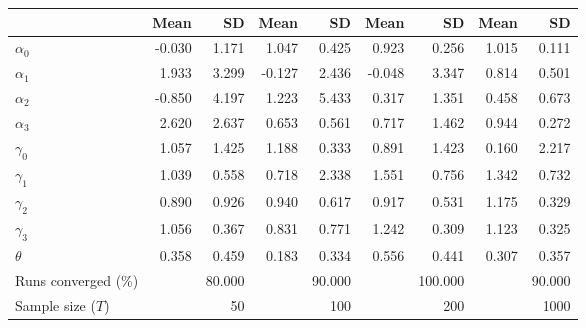 
\begin{tabular}[t]{lrrrrrrrr}
\toprule
  & Mean & SD & Mean  & SD  & Mean   & SD   & Mean    & SD   \\
\midrule
$\alpha_{0}$ & -0.030 & 1.171 & 1.047 & 0.425 & 0.923 & 0.256 & 1.015 & 0.111\\
$\alpha_{1}$ & 1.933 & 3.299 & -0.127 & 2.436 & -0.048 & 3.347 & 0.814 & 0.501\\
$\alpha_{2}$ & -0.850 & 4.197 & 1.223 & 5.433 & 0.317 & 1.351 & 0.458 & 0.673\\
$\alpha_{3}$ & 2.620 & 2.637 & 0.653 & 0.561 & 0.717 & 1.462 & 0.944 & 0.272\\
$\gamma_{0}$ & 1.057 & 1.425 & 1.188 & 0.333 & 0.891 & 1.423 & 0.160 & 2.217\\
$\gamma_{1}$ & 1.039 & 0.558 & 0.718 & 2.338 & 1.551 & 0.756 & 1.342 & 0.732\\
$\gamma_{2}$ & 0.890 & 0.926 & 0.940 & 0.617 & 0.917 & 0.531 & 1.175 & 0.329\\
$\gamma_{3}$ & 1.056 & 0.367 & 0.831 & 0.771 & 1.242 & 0.309 & 1.123 & 0.325\\
$\theta$ & 0.358 & 0.459 & 0.183 & 0.334 & 0.556 & 0.441 & 0.307 & 0.357\\
Runs converged (\%) &  & 80.000 &  & 90.000 &  & 100.000 &  & 90.000\\
Sample size ($T$) &  & 50 &  & 100 &  & 200 &  & 1000\\
\bottomrule
\end{tabular}
